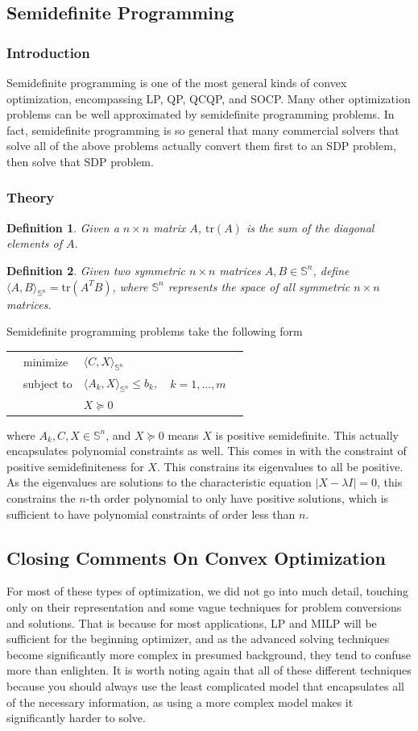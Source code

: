 \documentclass[10pt]{article}
\newtheorem*{definition}{Definition}
\begin{document}
\subsection{Semidefinite Programming}
\subsubsection{Introduction}
	Semidefinite programming is one of the most general kinds of convex optimization, encompassing LP, QP, QCQP, and SOCP. Many other optimization problems can be well approximated by semidefinite programming problems. In fact, semidefinite programming is so general that many commercial solvers that solve all of the above problems actually convert them first to an SDP problem, then solve that SDP problem.
\subsubsection{Theory}
	\begin{definition}
		Given a $n\times n$ matrix $A$, $\textrm{tr}(A)$ is the sum of the diagonal elements of $A$. 
	\end{definition}
	\begin{definition}
		Given two symmetric $n\times n$ matrices $A, B\in\mathbb{S}^n$, define $\langle A,B\rangle_{\mathbb{S}^n} = \textrm{tr}(A^TB)$, where $\mathbb{S}^n$ represents the space of all symmetric $n\times n$ matrices.
	\end{definition}
	Semidefinite programming problems take the following form\\
	\begin{tabularx}{\textwidth}{X l l l X}
		& minimize		& $\langle C,X\rangle_{\mathbb{S}^n}$ & & \\
		& subject to	& $\langle A_k,X\rangle_{\mathbb{S}^n}\leq b_k,$ & $k=1,...,m$ &\\
		& 				& $X\succeq0$ & & 
	\end{tabularx}
	where $A_k, C, X\in\mathbb{S}^n$, and $X\succeq0$ means $X$ is positive semidefinite\cite{freund}. This actually encapsulates polynomial constraints as well. This comes in with the constraint of positive semidefiniteness for $X$. This constrains its eigenvalues to all be positive. As the eigenvalues are solutions to the characteristic equation $|X-\lambda I|=0$, this constrains the $n$-th order polynomial to only have positive solutions, which is sufficient to have polynomial constraints of order less than $n$.
\subsection{Closing Comments On Convex Optimization}
	For most of these types of optimization, we did not go into much detail, touching only on their representation and some vague techniques for problem conversions and solutions. That is because for most applications, LP and MILP will be sufficient for the beginning optimizer, and as the advanced solving techniques become significantly more complex in presumed background, they tend to confuse more than enlighten. It is worth noting again that all of these different techniques because you should always use the least complicated model that encapsulates all of the necessary information, as using a more complex model makes it significantly harder to solve.
\end{document}
